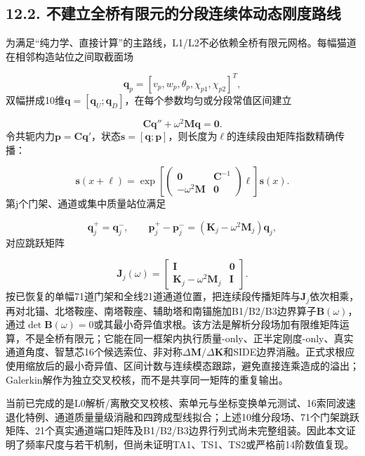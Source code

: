 \documentclass[UTF8,a4paper,11pt,fontset=none]{ctexart}
\begin{document}
\subsection*{12.2. 不建立全桥有限元的分段连续体动态刚度路线}
为满足“纯力学、直接计算”的主路线，L1/L2不必依赖全桥有限元网格。每幅猫道在相邻构造站位之间取截面场\par
\[
\mathbf q_p=[v_p,w_p,\theta_p,\chi_{p1},\chi_{p2}]^T,
\]
双幅拼成10维\(\mathbf q=[\mathbf q_U;\allowbreak \mathbf q_D]\)\allowbreak{}，在每个参数均匀或分段常值区间建立\par
\[
\mathbf C\mathbf q''+\omega^2\mathbf M\mathbf q=\mathbf0.
\]
令共轭内力\(\mathbf p=\mathbf C\mathbf q'\)\allowbreak{}，状态\(\mathbf s=[\mathbf q;\allowbreak \mathbf p]\)\allowbreak{}，则长度为\(\ell\)\allowbreak{}的连续段由矩阵指数精确传播：\par
\[
\mathbf s(x+\ell)=
\exp\!\left[
\begin{pmatrix}
\mathbf0&\mathbf C^{-1}\\
-\omega^2\mathbf M&\mathbf0
\end{pmatrix}\ell
\right]\mathbf s(x).
\]
第j个门架、通道或集中质量站位满足\par
\[
\mathbf q_j^+=\mathbf q_j^-,
\qquad
\mathbf p_j^+-\mathbf p_j^-=
(\mathbf K_j-\omega^2\mathbf M_j)\mathbf q_j,
\]
对应跳跃矩阵\par
\[
\mathbf J_j(\omega)=
\begin{bmatrix}
\mathbf I&\mathbf0\\
\mathbf K_j-\omega^2\mathbf M_j&\mathbf I
\end{bmatrix}.
\]
按已恢复的单幅71道门架和全线21道通道位置，把连续段传播矩阵与\(\mathbf J_j\)\allowbreak{}依次相乘，再对北锚、北塔鞍座、南塔鞍座、辅助塔和南锚施加B1/B2/B3边界算子\(\mathbf B(\omega)\)\allowbreak{}，通过\(\det\mathbf B(\omega)=0\)\allowbreak{}或其最小奇异值求根。该方法是解析分段场加有限维矩阵运算，不是全桥有限元；它能在同一框架内执行质量-only、正半定刚度-only、真实通道角度、智慧芯16个候选索位、非对称\(\Delta\mathbf M/\Delta\mathbf K\)\allowbreak{}和SIDE边界消融。正式求根应使用缩放后的最小奇异值、区间计数与连续模态跟踪，避免直接连乘造成的溢出；Galerkin解作为独立交叉校核，而不是共享同一矩阵的重复输出。\par
当前已完成的是L0解析/离散交叉校核、索单元与坐标变换单元测试、16索同波速退化特例、通道质量量级消融和四跨成型线拟合；上述10维分段场、71个门架跳跃矩阵、21个真实通道端口矩阵及B1/B2/B3边界行列式尚未完整组装。因此本文证明了频率尺度与若干机制，但尚未证明TA1、TS1、TS2或严格前14阶数值复现。\par
{}
\end{document}
